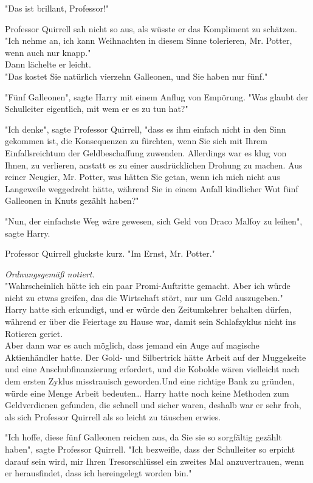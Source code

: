 {"Das ist brillant, Professor!"

Professor Quirrell sah nicht so aus, als wüsste er das Kompliment zu schätzen.\\ "Ich nehme an, ich kann Weihnachten in diesem Sinne tolerieren, Mr. Potter, wenn auch nur knapp."\\ Dann lächelte er leicht.\\ "Das kostet Sie natürlich vierzehn Galleonen, und Sie haben nur fünf."

"Fünf Galleonen", sagte Harry mit einem Anflug von Empörung. "Was glaubt der Schulleiter eigentlich, mit wem er es zu tun hat?"

"Ich denke", sagte Professor Quirrell, "dass es ihm einfach nicht in den Sinn gekommen ist, die Konsequenzen zu fürchten, wenn Sie sich mit Ihrem Einfallsreichtum der Geldbeschaffung zuwenden. Allerdings war es klug von Ihnen, zu verlieren, anstatt es zu einer ausdrücklichen Drohung zu machen. Aus reiner Neugier, Mr. Potter, was hätten Sie getan, wenn ich mich nicht aus Langeweile weggedreht hätte, während Sie in einem Anfall kindlicher Wut fünf Galleonen in Knuts gezählt haben?"

"Nun, der einfachste Weg wäre gewesen, sich Geld von Draco Malfoy zu leihen", sagte Harry.

Professor Quirrell gluckste kurz. "Im Ernst, Mr. Potter."

\emph{Ordnungsgemäß notiert.}\\ "Wahrscheinlich hätte ich ein paar Promi-Auftritte gemacht. Aber ich würde nicht zu etwas greifen, das die Wirtschaft stört, nur um Geld auszugeben."\\ Harry hatte sich erkundigt, und er würde den Zeitumkehrer behalten dürfen, während er über die Feiertage zu Hause war, damit sein Schlafzyklus nicht ins Rotieren geriet.\\ Aber dann war es auch möglich, dass jemand ein Auge auf magische Aktienhändler hatte. Der Gold- und Silbertrick hätte Arbeit auf der Muggelseite und eine Anschubfinanzierung erfordert, und die Kobolde wären vielleicht nach dem ersten Zyklus misstrauisch geworden.Und eine richtige Bank zu gründen, würde eine Menge Arbeit bedeuten… Harry hatte noch keine Methoden zum Geldverdienen gefunden, die schnell und sicher waren, deshalb war er sehr froh, als sich Professor Quirrell als so leicht zu täuschen erwies.

"Ich hoffe, diese fünf Galleonen reichen aus, da Sie sie so sorgfältig gezählt haben", sagte Professor Quirrell. "Ich bezweifle, dass der Schulleiter so erpicht darauf sein wird, mir Ihren Tresorschlüssel ein zweites Mal anzuvertrauen, wenn er herausfindet, dass ich hereingelegt worden bin."

}
